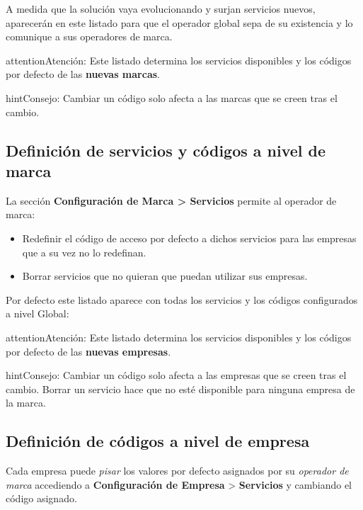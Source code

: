 \documentclass[letterpaper,10pt,spanish]{sphinxmanual}
\begin{document}
A medida que la solución vaya evolucionando y surjan servicios nuevos, aparecerán en este listado para que el operador global sepa de su existencia y lo comunique a sus operadores de marca.

\begin{notice}{attention}{Atención:}
Este listado determina los servicios disponibles y los códigos por defecto de las \textbf{nuevas marcas}.
\end{notice}

\begin{notice}{hint}{Consejo:}
Cambiar un código solo afecta a las marcas que se creen tras el cambio.
\end{notice}


\subsection{Definición de servicios y códigos a nivel de marca}
\label{pbx_features/services:services-and-codes-for-brands}
La sección \textbf{Configuración de Marca \textgreater{} Servicios} permite al operador de marca:
\begin{itemize}
\item {} 
Redefinir el código de acceso por defecto a dichos servicios para las empresas que a su vez no lo redefinan.

\item {} 
Borrar servicios que no quieran que puedan utilizar sus empresas.

\end{itemize}

Por defecto este listado aparece con todas los servicios y los códigos configurados a nivel Global:

\begin{notice}{attention}{Atención:}
Este listado determina los servicios disponibles y los códigos por defecto de las \textbf{nuevas empresas}.
\end{notice}

\begin{notice}{hint}{Consejo:}
Cambiar un código solo afecta a las empresas que se creen tras el cambio. Borrar un servicio hace que no esté disponible para ninguna empresa de la marca.
\end{notice}


\subsection{Definición de códigos a nivel de empresa}
\label{pbx_features/services:services-and-codes-for-companies}
Cada empresa puede \emph{pisar} los valores por defecto asignados por su \emph{operador de marca} accediendo a \textbf{Configuración de Empresa} \textgreater{} \textbf{Servicios} y cambiando el código asignado.
\end{document}
